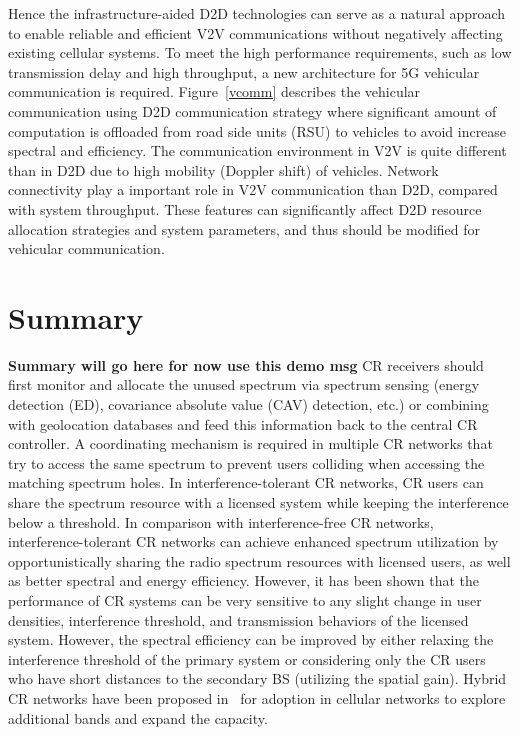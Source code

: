 Hence the infrastructure-aided D2D technologies can serve as a natural approach to enable reliable and efficient V2V communications without negatively affecting existing cellular systems. To meet the high performance requirements, such as low transmission delay and high throughput, a new architecture for 5G vehicular communication is required. Figure~\ref{vcomm} describes the vehicular communication  using D2D communication strategy where significant amount of computation is offloaded from road side units (RSU) to vehicles to avoid increase spectral and efficiency. The communication environment in V2V is quite different than in D2D due to high mobility (Doppler shift) of vehicles. Network connectivity play a important role in V2V communication than D2D, compared with system throughput. These features can significantly affect D2D resource allocation strategies and system parameters, and thus should be modified for vehicular communication.

\section{Summary}
\textbf{Summary will go here for now use this demo msg} CR receivers should first monitor and allocate the unused spectrum via spectrum sensing (energy detection (ED), covariance absolute value (CAV) detection, etc.) or combining with geolocation databases and feed this information back to the central CR controller. A coordinating mechanism is required in multiple CR networks that try to access the same spectrum to prevent users colliding when accessing the matching spectrum holes. In interference-tolerant CR networks, CR users can share the spectrum resource with a licensed system while keeping the interference below a threshold. In comparison with interference-free CR networks, interference-tolerant CR networks can achieve enhanced spectrum utilization by opportunistically sharing the radio spectrum resources with licensed users, as well as better spectral and energy efficiency. However, it has been shown that the performance of CR systems can be very sensitive to any slight change in user densities, interference threshold, and transmission behaviors of the licensed system. However, the spectral efficiency can be improved by either relaxing the interference threshold of the primary system or considering only the CR users who have short distances to the secondary BS (utilizing the spatial gain). Hybrid CR networks have been proposed in~\cite{hong2010capacity} for adoption in cellular networks to explore additional bands and expand the capacity.


